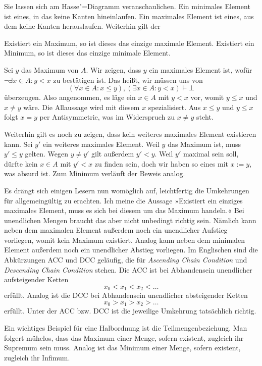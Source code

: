 \noindent
Sie lassen sich am Hasse"=Diagramm veranschaulichen. Ein minimales
Element ist eines, in das keine Kanten hineinlaufen. Ein maximales
Element ist eines, aus dem keine Kanten herauslaufen. Weiterhin
gilt der

\begin{Satz}
Existiert ein Maximum, so ist dieses das einzige maximale Element.
Existiert ein Minimum, so ist dieses das einzige minimale Element.
\end{Satz}
\begin{Beweis}
Sei $y$ das Maximum von $A$. Wir zeigen, dass $y$ ein maximales
Element ist, wofür $\lnot\exists x\in A\colon y<x$ zu bestätigen ist.
Das heißt, wir müssen uns von
\[(\forall x\in A\colon x\le y),(\exists x\in A\colon y<x)\vdash\bot\]
überzeugen. Also angenommen, es läge ein $x\in A$ mit $y<x$ vor, womit
$y\le x$ und $x\ne y$ wäre. Die Allaussage wird mit diesem $x$
spezialisiert. Aus $x\le y$ und $y\le x$ folgt $x=y$ per Antisymmetrie,
was im Widerspruch zu $x\ne y$ steht.

Weiterhin gilt es noch zu zeigen, dass kein weiteres maximales
Element existieren kann. Sei $y'$ ein weiteres maximales Element.
Weil $y$ das Maximum ist, muss $y'\le y$ gelten. Wegen $y\ne y'$
gilt außerdem $y'<y$. Weil $y'$ maximal sein soll, dürfte kein $x\in A$
mit $y'<x$ zu finden sein, doch wir haben so eines mit $x:=y$, was
absurd ist. Zum Minimum verläuft der Beweis analog.\,\qedsymbol
\end{Beweis}

\noindent
Es drängt sich einigen Lesern nun womöglich auf, leichtfertig die
Umkehrungen für allgemeingültig zu erachten. Ich meine die Aussage
»Existiert ein einziges maximales Element, muss es sich bei diesem um
das Maximum handeln.« Bei unendlichen Mengen braucht das aber nicht
unbedingt richtig sein. Nämlich kann neben dem maximalen Element
außerdem noch ein unendlicher Aufstieg vorliegen, womit kein
Maximum existiert. Analog kann neben dem minimalen Element außerdem
noch ein unendlicher Abstieg vorliegen. Im Englischen sind die
Abkürzungen ACC und DCC geläufig, die für \emph{Ascending Chain Condition}
und \emph{Descending Chain Condition}
stehen. Die ACC ist bei Abhandensein unendlicher aufsteigender Ketten
\[x_0<x_1<x_2<\ldots\]
erfüllt. Analog ist die DCC bei Abhandensein unendlicher absteigender
Ketten
\[x_0>x_1>x_2>\ldots\]
erfüllt. Unter der ACC bzw. DCC ist die jeweilige Umkehrung tatsächlich
richtig.

Ein wichtiges Beispiel für eine Halbordnung ist die Teilmengenbeziehung.
Man folgert mühelos, dass das Maximum einer Menge, sofern existent,
zugleich ihr Supremum sein muss. Analog ist das Minimum einer Menge,
sofern existent, zugleich ihr Infimum.

